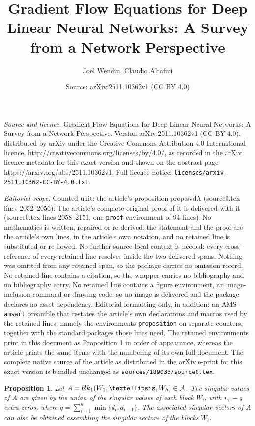 \documentclass[10pt,a4paper]{amsart}
\title{Gradient Flow Equations for Deep Linear Neural Networks: A Survey from a Network Perspective}
\author{Joel Wendin, Claudio Altafini}
\date{Source: arXiv:2511.10362v1 (CC BY 4.0)}
\newtheorem{proposition}{Proposition}
\def\block{{\rm blk}}
\begin{document}
\maketitle

\noindent\emph{Source and licence.} Gradient Flow Equations for Deep Linear Neural Networks: A Survey from a Network Perspective. Version arXiv:2511.10362v1 (CC BY 4.0), distributed by arXiv under the Creative Commons Attribution 4.0 International licence, http://creativecommons.org/licenses/by/4.0/, as recorded in the arXiv licence metadata for this exact version and shown on the abstract page https://arxiv.org/abs/2511.10362v1. Full licence notice: \texttt{licenses/arxiv-2511.10362-CC-BY-4.0.txt}.\par\smallskip

\noindent\textit{Editorial scope.} Counted unit: the article's proposition prop:svdA (source0.tex lines 2052--2056). The article's complete original proof of it is delivered with it (source0.tex lines 2058--2151, one \texttt{proof} environment of 94 lines). No mathematics is written, repaired or re-derived: the statement and the proof are the article's own lines, in the article's own notation, and no retained line is substituted or re-flowed.  No further source-local context is needed: every cross-reference of every retained line resolves inside the two delivered spans.  Nothing was omitted from any retained span, so the package carries no omission record.  No retained line contains a citation, so the wrapper carries no bibliography and no bibliography entry.  No retained line contains a figure environment, an image-inclusion command or drawing code, so no image is delivered and the package declares no asset dependency.  Editorial formatting only, in addition: an AMS \texttt{amsart} preamble that restates the article's own declarations and macros used by the retained lines, namely the environments \texttt{proposition} on separate counters, together with the standard packages those lines need.  The retained environments print in this document as Proposition 1 in order of appearance, whereas the article prints the same items with the numbering of its own full document.  The complete native source of the article as distributed in the arXiv e-print for this exact version is bundled unchanged as \texttt{sources/189033/source0.tex}.
\begin{proposition}
\label{prop:svdA}
Let $ A= \block_1(W_1, \ldots , W_h)\in \mathcal{A} $. The singular values of $A$ are given by the union of the singular values of each block $W_i$, with $n_v-q$ extra zeros, where $q=\sum_{i=1}^{h}\min\{d_i,d_{i-1}\}$.
The associated singular vectors of $A$ can also be obtained assembling the singular vectors of the blocks $ W_i$.
\end{proposition}
\end{document}
